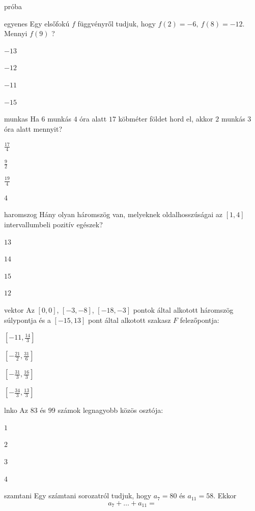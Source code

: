 \documentclass[12pt]{article}
\begin{document}
\begin{quiz}{próba}

\begin{multi}{egyenes}
Egy elsőfokú $f$ függvényről tudjuk, hogy $f(2)=-6,\ f(8)=-12$. Mennyi $f(9)$ ?
\item* $-13$
\item  $-12$
\item  $-11$
\item  $-15$
\end{multi}
\begin{multi}{munkas}
Ha $6$ munkás $4$ óra alatt $17$ köbméter földet hord el, akkor
$2$ munkás $3$ óra alatt mennyit? 

\item* $\frac{17}{4}$
\item  $\frac{9}{2}$
\item  $\frac{19}{4}$
\item  $4$
\end{multi}
\begin{multi}{haromszog}
Hány olyan háromszög van, melyeknek oldalhosszúságai az $[1,4]$ 
intervallumbeli pozitív egészek?
\item* $13$
\item  $14$
\item  $15$
\item  $12$
\end{multi}
\begin{multi}{vektor}
Az $\left[0, 0\right]$, $\left[-3, -8\right]$, $\left[-18, -3\right]$ pontok által alkotott háromszög súlypontja és a $\left[-15, 13\right]$ pont 
által alkotott szakasz $F$ felezőpontja:
\item* $\left[-11, \frac{14}{3}\right]$
\item  $\left[-\frac{21}{2}, \frac{31}{6}\right]$
\item  $\left[-\frac{31}{3}, \frac{16}{3}\right]$
\item  $\left[-\frac{34}{3}, \frac{13}{3}\right]$
\end{multi}
\begin{multi}{lnko}
Az $83$ és $99$ számok legnagyobb közös osztója:
\item* $1$
\item  $2$
\item  $3$
\item  $4$
\end{multi}
\begin{multi}{szamtani}
Egy számtani sorozatról tudjuk, hogy $a_{7}=80$ és $a_{11}=58$. Ekkor 
$$
a_{7}+\ldots +a_{11}=
$$

\end{multi}
\end{quiz}
\end{document}
